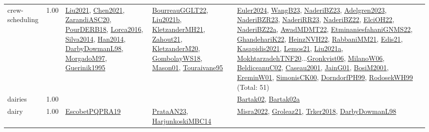 {\begin{longtable}{p{3cm}r>{\raggedright\arraybackslash}p{6cm}>{\raggedright\arraybackslash}p{6cm}>{\raggedright\arraybackslash}p{8cm}}
\index{crew-scheduling}\index{ApplicationAreas!crew-scheduling}crew-scheduling &  1.00 & \hyperref[detail:Liu2021]{Liu2021}, \hyperref[detail:Chen2021]{Chen2021}, \hyperref[detail:ZarandiASC20]{ZarandiASC20}, \hyperref[detail:PourDERB18]{PourDERB18}, \hyperref[detail:Lorca2016]{Lorca2016}, \hyperref[detail:Silva2014]{Silva2014}, \hyperref[detail:Han2014]{Han2014}, \hyperref[detail:DarbyDowmanL98]{DarbyDowmanL98}, \hyperref[detail:MorgadoM97]{MorgadoM97}, \hyperref[detail:Guerinik1995]{Guerinik1995} & \hyperref[detail:BourreauGGLT22]{BourreauGGLT22}, \hyperref[detail:Liu2021b]{Liu2021b}, \hyperref[detail:KletzanderMH21]{KletzanderMH21}, \hyperref[detail:Zahout21]{Zahout21}, \hyperref[detail:KletzanderM20]{KletzanderM20}, \hyperref[detail:GombolayWS18]{GombolayWS18}, \hyperref[detail:Mason01]{Mason01}, \hyperref[detail:Touraivane95]{Touraivane95} & \hyperref[detail:Euler2024]{Euler2024}, \hyperref[detail:WangB23]{WangB23}, \hyperref[detail:NaderiBZ23]{NaderiBZ23}, \hyperref[detail:Adelgren2023]{Adelgren2023}, \hyperref[detail:NaderiBZR23]{NaderiBZR23}, \hyperref[detail:NaderiRR23]{NaderiRR23}, \hyperref[detail:NaderiBZ22]{NaderiBZ22}, \hyperref[detail:ElciOH22]{ElciOH22}, \hyperref[detail:NaderiBZ22a]{NaderiBZ22a}, \hyperref[detail:AwadMDMT22]{AwadMDMT22}, \hyperref[detail:EtminaniesfahaniGNMS22]{EtminaniesfahaniGNMS22}, \hyperref[detail:GhandehariK22]{GhandehariK22}, \hyperref[detail:HeinzNVH22]{HeinzNVH22}, \hyperref[detail:RabbaniMM21]{RabbaniMM21}, \hyperref[detail:Edis21]{Edis21}, \hyperref[detail:Kasapidis2021]{Kasapidis2021}, \hyperref[detail:Lemos21]{Lemos21}, \hyperref[detail:Liu2021a]{Liu2021a}, \hyperref[detail:MokhtarzadehTNF20]{MokhtarzadehTNF20}...\hyperref[detail:Gronkvist06]{Gronkvist06}, \hyperref[detail:MilanoW06]{MilanoW06}, \hyperref[detail:BeldiceanuC02]{BeldiceanuC02}, \hyperref[detail:Caseau2001]{Caseau2001}, \hyperref[detail:JainG01]{JainG01}, \hyperref[detail:BosiM2001]{BosiM2001}, \hyperref[detail:EreminW01]{EreminW01}, \hyperref[detail:SimonisCK00]{SimonisCK00}, \hyperref[detail:DorndorfPH99]{DorndorfPH99}, \hyperref[detail:RodosekWH99]{RodosekWH99} (Total: 51)\\
\index{dairies}\index{ApplicationAreas!dairies}dairies &  1.00 &  &  & \hyperref[detail:Bartak02]{Bartak02}, \hyperref[detail:Bartak02a]{Bartak02a}\\
\index{dairy}\index{ApplicationAreas!dairy}dairy &  1.00 & \hyperref[detail:EscobetPQPRA19]{EscobetPQPRA19} & \hyperref[detail:PrataAN23]{PrataAN23}, \hyperref[detail:HarjunkoskiMBC14]{HarjunkoskiMBC14} & \hyperref[detail:Misra2022]{Misra2022}, \hyperref[detail:Groleaz21]{Groleaz21}, \hyperref[detail:Trker2018]{Trker2018}, \hyperref[detail:DarbyDowmanL98]{DarbyDowmanL98}\\

\end{longtable}}
